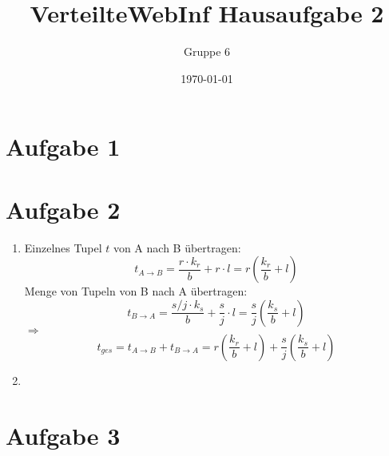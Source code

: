 \documentclass[a4paper]{article}
\author{Gruppe 6}
\title{\textbf{VerteilteWebInf Hausaufgabe 2}}
\date{\today}
\begin{document}
\maketitle

\section*{Aufgabe 1}


\section*{Aufgabe 2}
\begin{enumerate}[label=\alph*)]
\item Einzelnes Tupel $t$ von A nach B übertragen: 
\[t_{A\rightarrow B} = \frac{r\cdot k_r}{b}+r\cdot l = r\left(\frac{k_r}{b} + l \right)\]
Menge von Tupeln von B nach A übertragen:
\[t_{B\rightarrow A} = \frac{s/j\cdot k_s}{b}+\frac{s}{j}\cdot l = \frac{s}{j}\left(\frac{k_s}{b} +l\right)\]
$\Rightarrow$ \[t_{ges} = t_{A\rightarrow B} + t_{B\rightarrow A} =  r\left(\frac{k_r}{b} + l \right) +  \frac{s}{j}\left(\frac{k_s}{b} +l\right)\]

\item
\end{enumerate}

\section*{Aufgabe 3}
\end{document}
